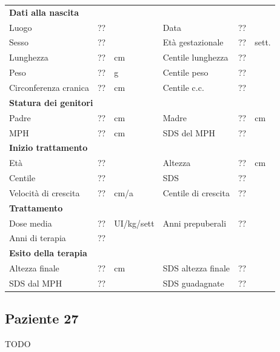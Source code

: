 \begin{table}[!h]
\begin{tabular}{lrllrl}
\toprule
\multicolumn{6}{l}{\textbf{Dati alla nascita}}\\
Luogo 		& \multicolumn{2}{l}{??} 	& Data 					& \multicolumn{2}{l}{??} 	\\
Sesso 		& \multicolumn{2}{l}{??} 	& Età gestazionale 		& ?? 		& sett.\\
Lunghezza 	& ?? 		& cm 				& Centile lunghezza		& ?? 		\\
Peso 		& ?? 		& g					& Centile peso			& ?? 		\\
Circonferenza cranica	& ?? 		& cm 	& Centile c.c.			& ?? \\
\midrule
\multicolumn{6}{l}{\textbf{Statura dei genitori}}\\
Padre 		& ?? & cm 	& Madre 				& ?? & cm \\
MPH 		& ?? & cm 	& SDS del MPH 			& ??\\
\midrule
\multicolumn{6}{l}{\textbf{Inizio trattamento}} \\
Età	& ?? & 		& Altezza 				& ?? & cm  \\
Centile & ?? 	 &		& SDS		& ?? \\
Velocità di crescita & ?? & cm/a	& Centile di crescita & ??\\
\midrule
\multicolumn{6}{l}{\textbf{Trattamento}} \\
Dose media		& ?? & UI/kg/sett & Anni prepuberali & ??\\
Anni di terapia & ??\\
\midrule
\multicolumn{6}{l}{\textbf{Esito della terapia}} \\
Altezza finale			& ?? & cm 	& SDS altezza finale		& ??\\
SDS dal MPH				& ?? &		& SDS guadagnate 			& ??\\
\bottomrule
\end{tabular}
\end{table}
\clearpage


\subsection*{Paziente 27}

TODO

